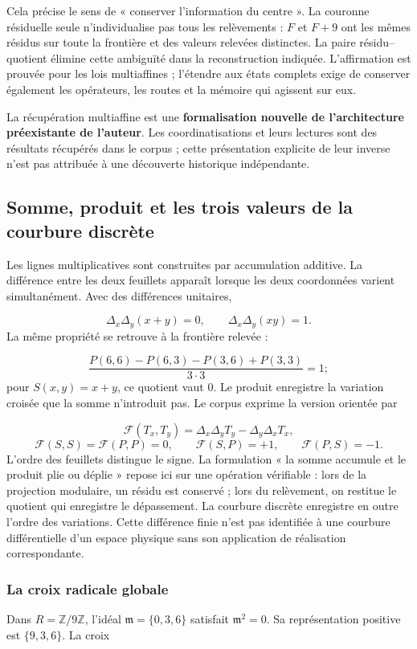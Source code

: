Cela précise le sens de « conserver l'information du centre ». La couronne résiduelle seule n'individualise pas tous les relèvements : \(F\) et \(F+9\) ont les mêmes résidus sur toute la frontière et des valeurs relevées distinctes. La paire résidu–quotient élimine cette ambiguïté dans la reconstruction indiquée. L'affirmation est prouvée pour les lois multiaffines ; l'étendre aux états complets exige de conserver également les opérateurs, les routes et la mémoire qui agissent sur eux.

La récupération multiaffine est une \textbf{formalisation nouvelle de l'architecture préexistante de l'auteur}. Les coordinatisations et leurs lectures sont des résultats récupérés dans le corpus ; cette présentation explicite de leur inverse n'est pas attribuée à une découverte historique indépendante.

\subsection{Somme, produit et les trois valeurs de la courbure discrète}
Les lignes multiplicatives sont construites par accumulation additive. La différence entre les deux feuillets apparaît lorsque les deux coordonnées varient simultanément. Avec des différences unitaires,

\[
\Delta_x\Delta_y(x+y)=0,
\qquad
\Delta_x\Delta_y(xy)=1.
\]
La même propriété se retrouve à la frontière relevée :

\[
\frac{P(6,6)-P(6,3)-P(3,6)+P(3,3)}{3\cdot3}=1;
\]
pour \(S(x,y)=x+y\), ce quotient vaut \(0\). Le produit enregistre la variation croisée que la somme n'introduit pas. Le corpus exprime la version orientée par

\[
\mathcal F(T_x,T_y)=\Delta_x\Delta_yT_y-\Delta_y\Delta_xT_x,
\]
\[
\mathcal F(S,S)=\mathcal F(P,P)=0,
\qquad \mathcal F(S,P)=+1,
\qquad \mathcal F(P,S)=-1.
\]
L'ordre des feuillets distingue le signe. La formulation « la somme accumule et le produit plie ou déplie » repose ici sur une opération vérifiable : lors de la projection modulaire, un résidu est conservé ; lors du relèvement, on restitue le quotient qui enregistre le dépassement. La courbure discrète enregistre en outre l'ordre des variations. Cette différence finie n'est pas identifiée à une courbure différentielle d'un espace physique sans son application de réalisation correspondante.

\subsubsection*{La croix radicale globale}
Dans \(R=\mathbb Z/9\mathbb Z\), l'idéal \(\mathfrak m=\{0,3,6\}\) satisfait \(\mathfrak m^2=0\). Sa représentation positive est \(\{9,3,6\}\). La croix


